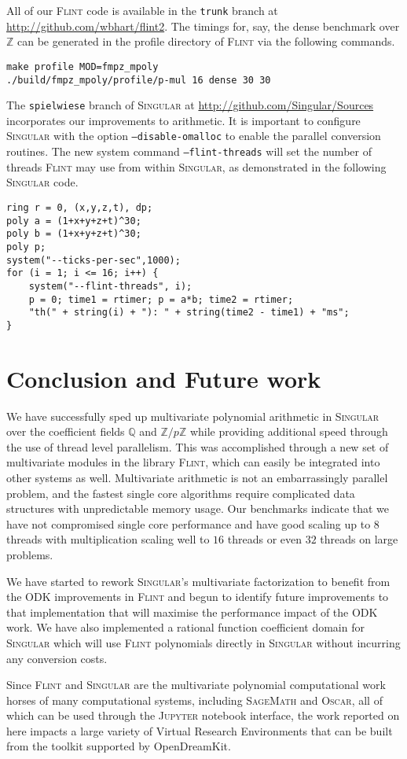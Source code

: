 \documentclass{deliverablereport}
\begin{document}
All of our \textsc{Flint} code is available in the {\tt trunk} branch at \url{http://github.com/wbhart/flint2}. The timings for, say, the dense benchmark over $\mathbb{Z}$ can be generated in the profile directory of \textsc{Flint} via the following commands.
\begin{verbatim}
make profile MOD=fmpz_mpoly
./build/fmpz_mpoly/profile/p-mul 16 dense 30 30
\end{verbatim}

The {\tt spielwiese} branch of \textsc{Singular} at \url{http://github.com/Singular/Sources} incorporates our improvements to arithmetic. It is important to configure \textsc{Singular} with the option {\tt --disable-omalloc} to enable the parallel conversion routines. The new system command {\tt --flint-threads} will set the number of threads \textsc{Flint} may use from within \textsc{Singular}, as demonstrated in the following \textsc{Singular} code.
\begin{verbatim}
ring r = 0, (x,y,z,t), dp;
poly a = (1+x+y+z+t)^30;
poly b = (1+x+y+z+t)^30;
poly p;
system("--ticks-per-sec",1000);
for (i = 1; i <= 16; i++) {
    system("--flint-threads", i);
    p = 0; time1 = rtimer; p = a*b; time2 = rtimer;
    "th(" + string(i) + "): " + string(time2 - time1) + "ms";
}
\end{verbatim}


\section{Conclusion and Future work}
We have successfully sped up multivariate polynomial arithmetic in \textsc{Singular} over the coefficient fields $\mathbb{Q}$ and $\mathbb{Z}/p \mathbb{Z}$ while providing additional speed through the use of thread level parallelism. This was accomplished through a new set of multivariate modules in the library \textsc{Flint}, which can easily be integrated into other systems as well. Multivariate arithmetic is not an embarrassingly parallel problem, and the fastest single core algorithms require complicated data structures with unpredictable memory usage. Our benchmarks indicate that we have not compromised single core performance and have good scaling up to $8$ threads with multiplication scaling well to $16$ threads or even $32$ threads on large problems.

We have started to rework \textsc{Singular}'s multivariate factorization to benefit from the ODK improvements in \textsc{Flint} and begun to identify future improvements to that implementation that will maximise the performance impact of the ODK work. We have also implemented a rational function coefficient domain for \textsc{Singular} which will use \textsc{Flint} polynomials directly in \textsc{Singular} without incurring any conversion costs.

Since \textsc{Flint} and \textsc{Singular} are the multivariate
polynomial computational work horses of many computational systems,
including \textsc{SageMath} and \textsc{Oscar}, all of which can be
used through the \textsc{Jupyter} notebook interface, the work
reported on here impacts a large variety of Virtual Research
Environments that can be built from the toolkit supported by
OpenDreamKit.

\printbibliography
\end{document}
